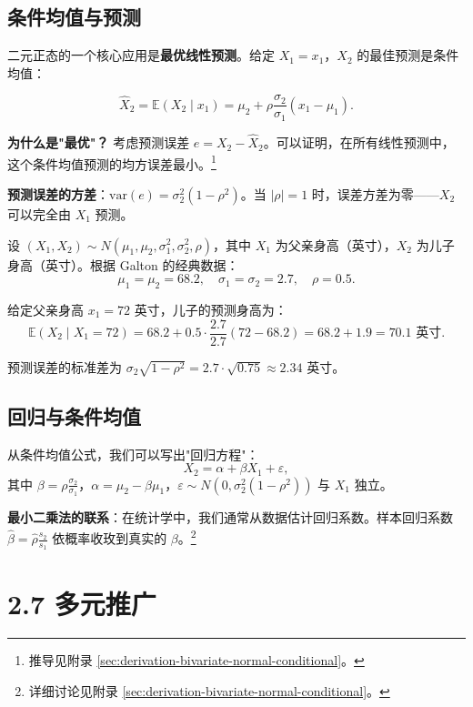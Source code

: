 \subsection{条件均值与预测}

二元正态的一个核心应用是\textbf{最优线性预测}。给定 $X_1 = x_1$，$X_2$ 的最佳预测是条件均值：

\[
\widehat{X}_2 = \mathbb{E}(X_2 \mid x_1) = \mu_2 + \rho\frac{\sigma_2}{\sigma_1}(x_1 - \mu_1).
\]

\textbf{为什么是"最优"？} 考虑预测误差 $e = X_2 - \widehat{X}_2$。可以证明，在所有线性预测中，这个条件均值预测的均方误差最小。\footnote{推导见附录 \cref{sec:derivation-bivariate-normal-conditional}。}

\textbf{预测误差的方差}：$\text{var}(e) = \sigma_2^2(1-\rho^2)$。当 $|\rho| = 1$ 时，误差方差为零——$X_2$ 可以完全由 $X_1$ 预测。

\begin{example}[身高与体重预测]\label{ex:height-weight-prediction-ch2}
设 $(X_1, X_2) \sim N(\mu_1, \mu_2, \sigma_1^2, \sigma_2^2, \rho)$，其中 $X_1$ 为父亲身高（英寸），$X_2$ 为儿子身高（英寸）。根据 Galton 的经典数据：
\[
\mu_1 = \mu_2 = 68.2, \quad \sigma_1 = \sigma_2 = 2.7, \quad \rho = 0.5.
\]

给定父亲身高 $x_1 = 72$ 英寸，儿子的预测身高为：
\[
\mathbb{E}(X_2 \mid X_1 = 72) = 68.2 + 0.5 \cdot \frac{2.7}{2.7}(72 - 68.2) = 68.2 + 1.9 = 70.1 \text{ 英寸}.
\]

预测误差的标准差为 $\sigma_2\sqrt{1-\rho^2} = 2.7 \cdot \sqrt{0.75} \approx 2.34$ 英寸。
\end{example}

\subsection{回归与条件均值}

从条件均值公式，我们可以写出"回归方程"：
\[
X_2 = \alpha + \beta X_1 + \varepsilon,
\]
其中 $\beta = \rho \frac{\sigma_2}{\sigma_1}$，$\alpha = \mu_2 - \beta \mu_1$，$\varepsilon \sim N(0, \sigma_2^2(1-\rho^2))$ 与 $X_1$ 独立。

\textbf{最小二乘法的联系}：在统计学中，我们通常从数据估计回归系数。样本回归系数 $\widehat{\beta} = \widehat{\rho} \frac{s_2}{s_1}$ 依概率收玫到真实的 $\beta$。\footnote{详细讨论见附录 \cref{sec:derivation-bivariate-normal-conditional}。}

\section{2.7 多元推广}\label{sec:2.7}

